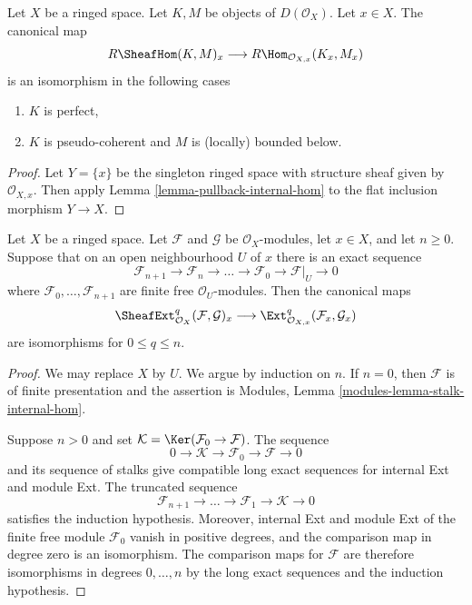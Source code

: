 \begin{lemma}
\label{lemma-stalk-internal-hom}
Let $X$ be a ringed space. Let $K, M$ be objects of $D(\mathcal{O}_X)$.
Let $x \in X$. The canonical map
$$
R\SheafHom(K, M)_x \longrightarrow
R\Hom_{\mathcal{O}_{X, x}}(K_x, M_x)
$$
is an isomorphism in the following cases
\begin{enumerate}
\item $K$ is perfect,
\item $K$ is pseudo-coherent and $M$ is (locally) bounded below.
\end{enumerate}
\end{lemma}

\begin{proof}
Let $Y = \{x\}$ be the singleton ringed space with structure sheaf
given by $\mathcal{O}_{X, x}$. Then apply
Lemma \ref{lemma-pullback-internal-hom}
to the flat inclusion morphism $Y \to X$.
\end{proof}

\begin{lemma}
\label{lemma-stalk-ext-finite-resolution}
Let $X$ be a ringed space. Let $\mathcal{F}$ and $\mathcal{G}$ be
$\mathcal{O}_X$-modules, let $x \in X$, and let $n \geq 0$. Suppose that
on an open neighbourhood $U$ of $x$ there is an exact sequence
$$
\mathcal{F}_{n + 1} \longrightarrow \mathcal{F}_n \longrightarrow
\ldots \longrightarrow \mathcal{F}_0 \longrightarrow
\mathcal{F}|_U \longrightarrow 0
$$
where $\mathcal{F}_0, \ldots, \mathcal{F}_{n + 1}$ are finite free
$\mathcal{O}_U$-modules. Then the canonical maps
$$
\SheafExt^q_{\mathcal{O}_X}(\mathcal{F}, \mathcal{G})_x
\longrightarrow
\Ext^q_{\mathcal{O}_{X, x}}(\mathcal{F}_x, \mathcal{G}_x)
$$
are isomorphisms for $0 \leq q \leq n$.
\end{lemma}

\begin{proof}
We may replace $X$ by $U$. We argue by induction on $n$. If $n = 0$,
then $\mathcal{F}$ is of finite presentation and the assertion is
Modules, Lemma \ref{modules-lemma-stalk-internal-hom}.

Suppose $n > 0$ and set
$\mathcal{K} = \Ker(\mathcal{F}_0 \to \mathcal{F})$. The sequence
$$
0 \longrightarrow \mathcal{K} \longrightarrow \mathcal{F}_0
\longrightarrow \mathcal{F} \longrightarrow 0
$$
and its sequence of stalks give compatible long exact sequences for
internal Ext and module Ext. The truncated sequence
$$
\mathcal{F}_{n + 1} \longrightarrow \ldots \longrightarrow
\mathcal{F}_1 \longrightarrow \mathcal{K} \longrightarrow 0
$$
satisfies the induction hypothesis. Moreover, internal Ext and module Ext
of the finite free module $\mathcal{F}_0$ vanish in positive degrees, and
the comparison map in degree zero is an isomorphism. The comparison maps
for $\mathcal{F}$ are therefore isomorphisms in degrees $0, \ldots, n$
by the long exact sequences and the induction hypothesis.
\end{proof}

